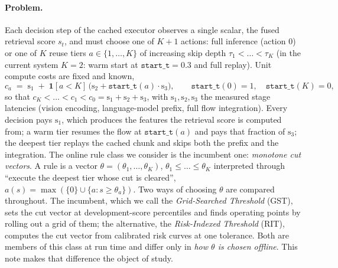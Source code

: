 \documentclass{article}
\begin{document}
\paragraph{Problem.}
Each decision step of the cached executor observes a single scalar, the fused
retrieval score $s_t$, and must choose one of $K{+}1$ actions: full inference
(action $0$) or one of $K$ reuse tiers $a \in \{1, \dots, K\}$ of increasing
skip depth $\tau_1 < \dots < \tau_K$ (in the current system $K = 2$: warm
start at $\mathtt{start\_t} = 0.3$ and full replay). Unit compute costs are
fixed and known,
\begin{equation}
c_a \;=\; \mathrm{s}_1 \;+\; \mathbf{1}[a < K]\,\bigl( \mathrm{s}_2 +
\mathtt{start\_t}(a)\cdot \mathrm{s}_3 \bigr),
\qquad
\mathtt{start\_t}(0) = 1, \quad \mathtt{start\_t}(K) = 0,
\label{eq:cost}
\end{equation}
so that $c_K < \dots < c_1 < c_0 = \mathrm{s}_1 + \mathrm{s}_2 + \mathrm{s}_3$,
with $\mathrm{s}_1, \mathrm{s}_2, \mathrm{s}_3$ the measured stage latencies
(vision encoding, language-model prefix, full flow integration). Every
decision pays $\mathrm{s}_1$, which produces the features the retrieval score
is computed from; a warm tier resumes the flow at $\mathtt{start\_t}(a)$ and
pays that fraction of $\mathrm{s}_3$; the deepest tier replays the cached
chunk and skips both the prefix and the integration.
The online rule class we consider is the incumbent one: \emph{monotone cut
vectors}. A rule is a vector $\theta = (\theta_1, \dots, \theta_K)$,
$\theta_1 \le \dots \le \theta_K$ interpreted through ``execute the deepest
tier whose cut is cleared'', $a(s) = \max(\{0\} \cup \{a : s \ge
\theta_a\})$. Two ways of choosing $\theta$ are compared throughout. The incumbent, which
we call the \emph{Grid-Searched Threshold} (GST), sets the cut vector at
development-score percentiles and finds operating points by rolling out a
grid of them; the alternative, the \emph{Risk-Indexed Threshold} (RIT),
computes the cut vector from calibrated risk curves at one tolerance. Both
are members of this class at run time and differ only in \emph{how $\theta$
is chosen offline}. This note makes that difference the object of study.
\end{document}
